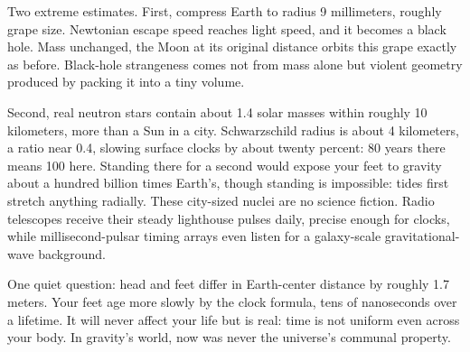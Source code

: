 
\begin{thought}
Two extreme estimates. First, compress Earth to radius 9 millimeters, roughly grape size. Newtonian escape speed reaches light speed, and it becomes a black hole. Mass unchanged, the Moon at its original distance orbits this grape exactly as before. Black-hole strangeness comes not from mass alone but violent geometry produced by packing it into a tiny volume.

Second, real neutron stars contain about 1.4 solar masses within roughly 10 kilometers, more than a Sun in a city. Schwarzschild radius is about 4 kilometers, a ratio near 0.4, slowing surface clocks by about twenty percent: 80 years there means 100 here. Standing there for a second would expose your feet to gravity about a hundred billion times Earth's, though standing is impossible: tides first stretch anything radially. These city-sized nuclei are no science fiction. Radio telescopes receive their steady lighthouse pulses daily, precise enough for clocks, while millisecond-pulsar timing arrays even listen for a galaxy-scale gravitational-wave background.

One quiet question: head and feet differ in Earth-center distance by roughly 1.7 meters. Your feet age more slowly by the clock formula, tens of nanoseconds over a lifetime. It will never affect your life but is real: time is not uniform even across your body. In gravity's world, now was never the universe's communal property.
\end{thought}

